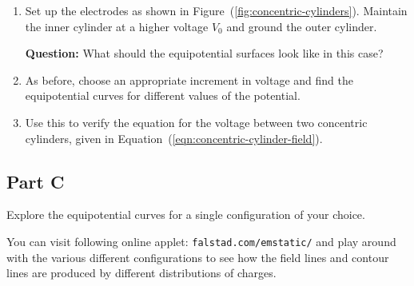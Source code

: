 \begin{enumerate}
    \item Set up the electrodes as shown in Figure~(\ref{fig:concentric-cylinders}). Maintain the inner cylinder at a higher voltage $V_0$ and ground the outer cylinder.
    
    \begin{question}
        \textbf{Question:} What should the equipotential surfaces look like in this case?
    \end{question}
    
    \item As before, choose an appropriate increment in voltage and find the equipotential curves for different values of the potential. 
    
    \item Use this to verify the equation for the voltage between two concentric cylinders, given in Equation~(\ref{eqn:concentric-cylinder-field}).
\end{enumerate}



\subsection*{Part C}

Explore the equipotential curves for a single configuration of your choice. 

\begin{tip}
    You can visit following online applet: \nolinkurl{falstad.com/emstatic/} and play around with the various different configurations to see how the field lines and contour lines are produced by different distributions of charges. 
\end{tip}